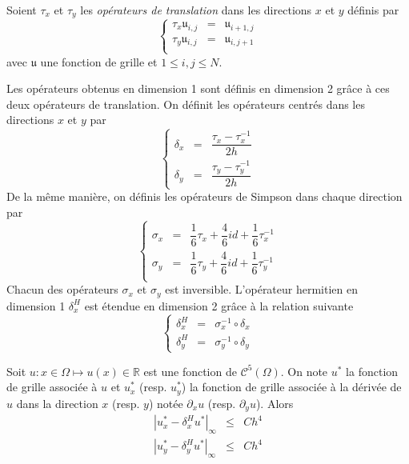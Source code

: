 \begin{definition}
Soient $\tau_x$ et $\tau_y$ les \textit{opérateurs de translation} dans les directions $x$ et $y$ définis par
\begin{equation}
\left\lbrace
\begin{array}{rcl}
\tau_x \mathfrak{u}_{i,j} & = & \mathfrak{u}_{i+1,j}\\
\tau_y \mathfrak{u}_{i,j} & = & \mathfrak{u}_{i,j+1}\\
\end{array}
\right.
\end{equation}
avec $\mathfrak{u}$ une fonction de grille et $1 \leq i,j \leq N$.
\end{definition}

Les opérateurs obtenus en dimension 1 sont définis en dimension 2 grâce à ces deux opérateurs de translation. On définit les opérateurs centrés dans les directions $x$ et $y$ par 
\begin{equation}
\left\lbrace
\begin{array}{rcl}
\delta_x & = & \dfrac{\tau_x - \tau_x^{-1}}{2h} \\
\delta_y & = & \dfrac{\tau_y - \tau_y^{-1}}{2h}
\end{array}
\right.
\label{eq:der_centrée_2D}
\end{equation}
De la même manière, on définis les opérateurs de Simpson dans chaque direction par 
\begin{equation}
\left\lbrace
\begin{array}{rcl}
\sigma_x & = & \dfrac{1}{6} \tau_x + \dfrac{4}{6} id + \dfrac{1}{6} \tau_x^{-1} \\
\sigma_y & = & \dfrac{1}{6} \tau_y + \dfrac{4}{6} id + \dfrac{1}{6} \tau_y^{-1} \\
\end{array}
\right.
\label{eq:simpson_2D}
\end{equation}
Chacun des opérateurs $\sigma_x$ et $\sigma_y$ est inversible.
L'opérateur hermitien en dimension 1 $\delta_x^H$ est étendue en dimension 2 grâce à la relation suivante 
\begin{equation}
\left\lbrace
\begin{array}{rcl}
\delta_x^H & = & \sigma_x^{-1} \circ \delta_x \\
\delta_y^H & = & \sigma_y^{-1} \circ \delta_y
\end{array}
\right.
\label{eq:der_herm_2D}
\end{equation}

\begin{theoreme}
Soit $u : x \in \Omega \mapsto u(x) \in \mathbb{R}$ est une fonction de $\mathcal{C}^5 (\Omega)$. On note $u^*$ la fonction de grille associée à $u$ et $u_x^*$ (resp. $u_y^*$) la fonction de grille associée à la dérivée de $u$ dans la direction $x$ (resp. $y$) notée $\partial_x u$ (resp. $\partial_y u$). Alors
\begin{equation}
\begin{array}{rcl}
|u^*_{x} - \delta_x^H u^*|_{\infty} &\leq& C h^4\\
|u^*_{y} - \delta_y^H u^*|_{\infty} &\leq& C h^4
\end{array}
\end{equation}
\end{theoreme}

